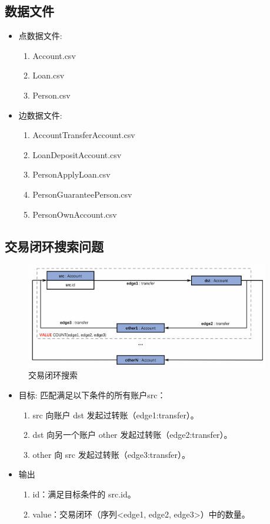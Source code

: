 \subsection{数据文件}
\begin{itemize}
  \item 点数据文件:
    \begin{enumerate}
      \item Account.csv
      \item Loan.csv
      \item Person.csv
    \end{enumerate}
  \item 边数据文件:
    \begin{enumerate}
      \item AccountTransferAccount.csv
      \item LoanDepositAccount.csv
      \item PersonApplyLoan.csv
      \item PersonGuaranteePerson.csv
      \item PersonOwnAccount.csv
    \end{enumerate}
\end{itemize}

\subsection{交易闭环搜索问题}
\begin{figure}[H]
  \begin{center}
    \includegraphics[width=0.95\textwidth]{./figures/蚂蚁改5-264319.png}
  \end{center}
  \caption{交易闭环搜索}
\end{figure}

\begin{itemize}
  \item 目标: 匹配满足以下条件的所有账户src：
    \begin{enumerate}
      \item src 向账户 dst 发起过转账（edge1:transfer）。
      \item dst 向另一个账户 other 发起过转账（edge2:transfer）。
      \item other 向 src 发起过转账（edge3:transfer）。
    \end{enumerate}
  \item 输出
    \begin{enumerate}
      \item id：满足目标条件的 src.id。
      \item value：交易闭环（序列<edge1, edge2, edge3>）中的数量。
    \end{enumerate}
\end{itemize}

